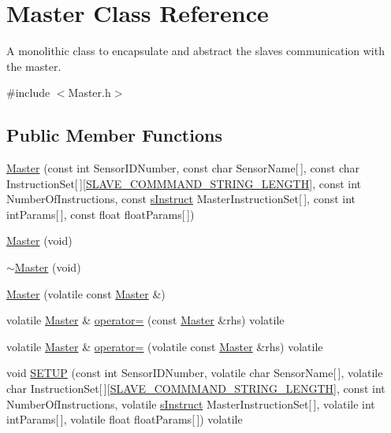\hypertarget{class_master}{}\section{Master Class Reference}
\label{class_master}


A monolithic class to encapsulate and abstract the slave\textquotesingle{}s communication with the master.  




{\ttfamily \#include $<$Master.\+h$>$}

\subsection*{Public Member Functions}
\begin{DoxyCompactItemize}
\item 
\mbox{\hyperlink{class_master_afd2e9903066a53c737be92639cfa15b0}{Master}} (const int Sensor\+I\+D\+Number, const char Sensor\+Name\mbox{[}$\,$\mbox{]}, const char Instruction\+Set\mbox{[}$\,$\mbox{]}\mbox{[}\mbox{\hyperlink{_s_p_i___instruction_set_8h_afb2f23f8980c03317ec47ce151335ec7}{S\+L\+A\+V\+E\+\_\+\+C\+O\+M\+M\+M\+A\+N\+D\+\_\+\+S\+T\+R\+I\+N\+G\+\_\+\+L\+E\+N\+G\+TH}}\mbox{]}, const int Number\+Of\+Instructions, const \mbox{\hyperlink{_s_p_i___instruction_set_8h_a949ec019a0f52780dcdd7d5a5ba73e47}{s\+Instruct}} Master\+Instruction\+Set\mbox{[}$\,$\mbox{]}, const int int\+Params\mbox{[}$\,$\mbox{]}, const float float\+Params\mbox{[}$\,$\mbox{]})
\item 
\mbox{\hyperlink{class_master_a89241ed8839b9fe5ec29d904630a9d3e}{Master}} (void)
\item 
\mbox{\hyperlink{class_master_a58d721f62d1c8bbf84840b864f2e482a}{$\sim$\+Master}} (void)
\item 
\mbox{\hyperlink{class_master_a339116daf8910b52da4d608c8c7b3944}{Master}} (volatile const \mbox{\hyperlink{class_master}{Master}} \&)
\item 
volatile \mbox{\hyperlink{class_master}{Master}} \& \mbox{\hyperlink{class_master_a54259c8db640b88dcf5de5594a947b1c}{operator=}} (const \mbox{\hyperlink{class_master}{Master}} \&rhs) volatile
\item 
volatile \mbox{\hyperlink{class_master}{Master}} \& \mbox{\hyperlink{class_master_a0ce51778d73a67179e58ecc6e136bef9}{operator=}} (volatile const \mbox{\hyperlink{class_master}{Master}} \&rhs) volatile
\item 
void \mbox{\hyperlink{class_master_a5af38dc77ec10af275ed892e756aee64}{S\+E\+T\+UP}} (const int Sensor\+I\+D\+Number, volatile char Sensor\+Name\mbox{[}$\,$\mbox{]}, volatile char Instruction\+Set\mbox{[}$\,$\mbox{]}\mbox{[}\mbox{\hyperlink{_s_p_i___instruction_set_8h_afb2f23f8980c03317ec47ce151335ec7}{S\+L\+A\+V\+E\+\_\+\+C\+O\+M\+M\+M\+A\+N\+D\+\_\+\+S\+T\+R\+I\+N\+G\+\_\+\+L\+E\+N\+G\+TH}}\mbox{]}, const int Number\+Of\+Instructions, volatile \mbox{\hyperlink{_s_p_i___instruction_set_8h_a949ec019a0f52780dcdd7d5a5ba73e47}{s\+Instruct}} Master\+Instruction\+Set\mbox{[}$\,$\mbox{]}, volatile int int\+Params\mbox{[}$\,$\mbox{]}, volatile float float\+Params\mbox{[}$\,$\mbox{]}) volatile

\end{DoxyCompactItemize}
